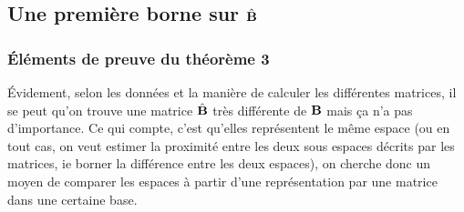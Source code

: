 \documentclass[12pt]{article}
\begin{document}
\subsection{Une première borne sur $\hat{\bf B}$} 
\subsubsection{Éléments de preuve du théorème 3}\label{pv_th3}
Évidement, selon les données et la manière de calculer les différentes matrices, il se peut qu'on trouve une matrice $\hat{{\bf B}}$ très différente de ${\bf B}$ mais ça n'a pas d'importance. Ce qui compte, c'est qu'elles représentent le même espace (ou en tout cas, on veut estimer la proximité entre les deux sous espaces décrits par les matrices, ie borner la différence entre les deux espaces), on cherche donc un moyen de comparer les espaces à partir d'une représentation par une matrice dans une certaine base.\\
\end{document}
